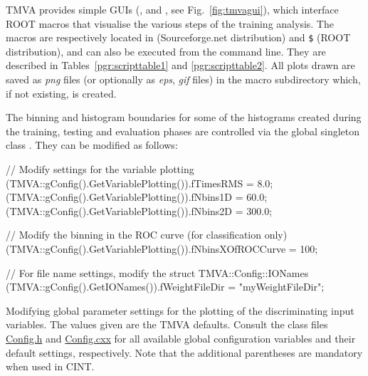 TMVA provides simple GUIs (,
 and 
, see
Fig.~\ref{fig:tmvagui}), which interface ROOT macros that visualise
the various steps of the training analysis. The macros are
respectively located in  (Sourceforge.net
distribution) and {\tt \$} (ROOT
distribution), and can also be executed from the command line. They
are described in Tables~\ref{pgr:scripttable1} and
\ref{pgr:scripttable2}. All plots drawn are saved as {\em png} files
(or optionally as {\em eps}, {\em gif} files) in the macro
subdirectory  which, if not existing, is created.

The binning and histogram boundaries for some of the histograms
created during the training, testing and evaluation phases are
controlled via the global singleton class . They
can be modified as follows:
\begin{codeexample}
\begin{tmvacode}
// Modify settings for the variable plotting
(TMVA::gConfig().GetVariablePlotting()).fTimesRMS = 8.0;
(TMVA::gConfig().GetVariablePlotting()).fNbins1D  = 60.0;
(TMVA::gConfig().GetVariablePlotting()).fNbins2D  = 300.0;

// Modify the binning in the ROC curve (for classification only)
(TMVA::gConfig().GetVariablePlotting()).fNbinsXOfROCCurve = 100;

// For file name settings, modify the struct TMVA::Config::IONames
(TMVA::gConfig().GetIONames()).fWeightFileDir = "myWeightFileDir";
\end{tmvacode}
\caption[.]{\codeexampleCaptionSize Modifying global parameter
  settings for the plotting of the discriminating input variables. The
  values given are the TMVA defaults. Consult the class files
  \href{http://tmva.svn.sourceforge.net/viewvc/tmva/trunk/TMVA/src/Config.h?view=markup}{Config.h}
  and
  \href{http://tmva.svn.sourceforge.net/viewvc/tmva/trunk/TMVA/src/Config.cxx?view=markup}{Config.cxx}
  for all available global configuration variables and their default
  settings, respectively.  Note that the additional parentheses are
  mandatory when used in CINT.}
\label{ce:gconfig}
\end{codeexample}
